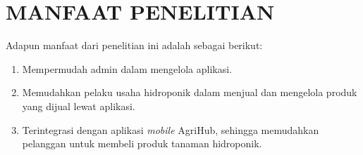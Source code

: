 \section{\uppercase{MANFAAT PENELITIAN}}
Adapun manfaat dari penelitian ini adalah sebagai berikut:
\begin{enumerate}
	\item Mempermudah admin dalam mengelola aplikasi.
	\item Memudahkan pelaku usaha hidroponik dalam menjual dan mengelola produk yang dijual lewat aplikasi.
	\item Terintegrasi dengan aplikasi \textit{mobile} AgriHub, sehingga memudahkan pelanggan untuk membeli produk tanaman hidroponik.
	
\end{enumerate}

\begin{comment}

\end{comment}